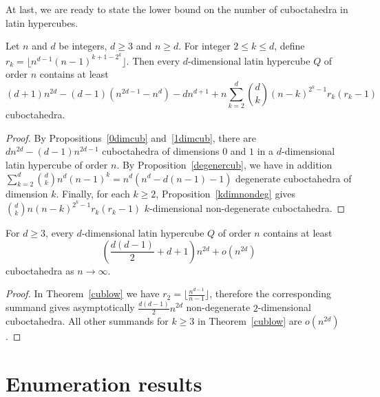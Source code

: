 \documentclass[a4paper]{article}
\begin{document}
 At last, we are ready to state the lower bound on the number of cuboctahedra in latin hypercubes.  

\begin{theorem} \label{cublow}
Let $n$ and $d$ be integers,  $d \geq  3$ and $n \geq d$. For integer $2 \leq k \leq d$, define $r_k = \lfloor n^{d-1} (n-1)^{k + 1 - 2^k}  \rfloor$.  Then every $d$-dimensional   latin hypercube  $Q$ of order $n$ contains at least 
$$(d+1) n^{2d} - (d-1) ( n^{2d-1} - n^{d} )  - d n^{d+1}   + n\sum\limits_{k = 2}^d   {d \choose k}  (n-k)^{2^k-1} r_k(r_k-1) $$
  cuboctahedra. 
\end{theorem} 



\begin{proof}
By Propositions~\ref{0dimcub} and~\ref{1dimcub}, there are $dn^{2d} - (d-1)n^{2d-1} $ cuboctahedra of dimensions $0$ and $1$ in a $d$-dimensional  latin hypercube of order $n$.  
By Proposition~\ref{degenercub}, we have in addition $\sum\limits_{k = 2}^d  {d \choose k} n^d (n-1)^k = n^d (n^d - d (n-1) - 1)$ degenerate cuboctahedra of dimension $k$. Finally,  for each $k \geq 2$, Proposition~\ref{kdimnondeg}  gives $ {d \choose k}  n (n-k)^{2^k -1} r_k(r_k - 1)$ $k$-dimensional non-degenerate cuboctahedra. 
\end{proof}

\begin{sled} 
For $d \geq 3$, every $d$-dimensional   latin hypercube  $Q$ of order $n$ contains at least 
 $$\left(\frac{d(d-1)}{2} + d +1 \right) n^{2d} + o(n^{2d})$$ 
 cuboctahedra as $n \rightarrow \infty$.
\end{sled}

\begin{proof}
In Theorem~\ref{cublow}  we have $r_2 = \lfloor \frac{ n^{d-1}}{n-1}    \rfloor $, therefore the corresponding  summand    gives asymptotically $\frac{d(d-1)}{2} n^{2d}$   non-degenerate  $2$-dimensional cuboctahedra. All other summands for $k \geq 3$  in Theorem~\ref{cublow}  are $o (n^{2d})$. 
\end{proof} 









\section{Enumeration results} \label{enumersec}
\end{document}
